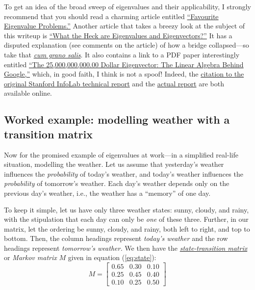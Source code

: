 \documentclass[
  12pt,
  a4paper,
]{article}
\begin{document}
To get an idea of the broad sweep of eigenvalues and their
applicability, I strongly recommend that you should read a charming
article entitled
\href{http://people.maths.ox.ac.uk/trefethen/dec11.pdf}{``Favourite
Eigenvalue Problems.''} Another article that takes a breezy look at the
subject of this writeup is
\href{http://hubpages.com/education/What-the-Heck-are-Eigenvalues-and-Eigenvectors}{``What
the Heck are Eigenvalues and Eigenvectors?''} It has a disputed
explanation (see comments on the article) of how a bridge collapsed---so
take that
\href{https://www.thefreedictionary.com/cum+grano+salis}{\emph{cum grano
salis}}. It also contains a link to a PDF paper interestingly entitled
\href{http://www.rose-hulman.edu/~bryan/googleFinalVersionFixed.pdf}{``The
25,000,000,000.00 Dollar Eigenvector: The Linear Algebra Behind
Google,''} which, in good faith, I think is not a spoof! Indeed, the
\href{http://ilpubs.stanford.edu:8090/422/}{citation to the original
Stanford InfoLab technical report} and the
\href{http://ilpubs.stanford.edu:8090/422/1/1999-66.pdf}{actual report}
are both available online.

\hypertarget{worked-example-modelling-weather-with-a-transition-matrix}{%
\subsection{Worked example: modelling weather with a transition
matrix}\label{worked-example-modelling-weather-with-a-transition-matrix}}

Now for the promised example of eigenvalues at work---in a simplified
real-life situation, modelling the weather. Let us assume that
yesterday's weather influences the \emph{probability} of today's
weather, and today's weather influences the \emph{probability} of
tomorrow's weather. Each day's weather depends only on the previous
day's weather, i.e., the weather has a ``memory'' of one day.

To keep it simple, let us have only three weather states: sunny, cloudy,
and rainy, with the stipulation that each day can only be \emph{one} of
these three. Further, in our matrix, let the ordering be sunny, cloudy,
and rainy, both left to right, and top to bottom. Then, the column
headings represent \emph{today's weather} and the row headings represent
\emph{tomorrow's weather.} We then have the
\href{https://en.wikipedia.org/wiki/Stochastic_matrix}{\emph{state-transition
matrix}} or \emph{Markov matrix} \(M\) given in equation
(\ref{eq:state}): \begin{equation}
M = \begin{bmatrix}
0.65 & 0.30 & 0.10\\
0.25 & 0.45 & 0.40\\
0.10 & 0.25 & 0.50
\end{bmatrix}
\label{eq:state}\end{equation}
\end{document}
